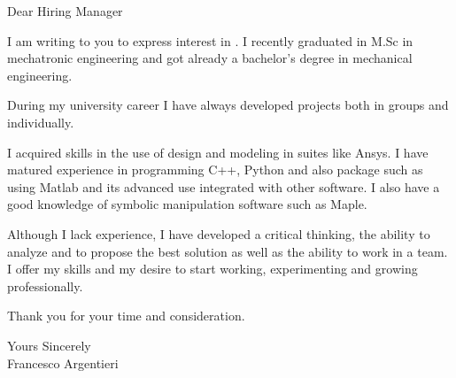 \documentclass[a4paper,english]{friggeri-letter}
\begin{document}
\address{
   Circonvallazione Istoniense, 20 \\
   Vasto (CH), 66054 \\
   Italy
}



\opening{Dear Hiring Manager}

I am writing to you to express interest in .
I recently graduated in M.Sc in mechatronic engineering and got already a bachelor's degree in mechanical engineering.

During my university career I have always developed projects both in groups and individually.

I acquired skills in the use of design and modeling in suites like Ansys. I have matured experience in programming C++, Python and also package such as using Matlab and its advanced use integrated with other software.
I also have a good knowledge of symbolic manipulation software such as Maple. 

Although I lack experience, I have developed a critical thinking, the ability to analyze and to propose the best solution as well as the ability to work in a team. 
I offer my skills and my desire to start working, experimenting and growing professionally.

Thank you for your time and consideration.

\closing{
   Yours Sincerely\\
   Francesco Argentieri}
\end{document}
